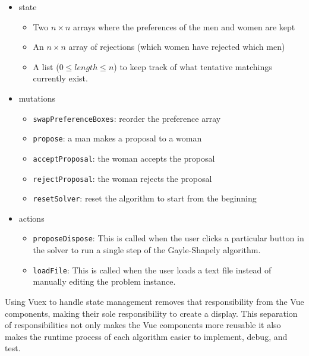 \begin{itemize}
	\item state
	\begin{itemize}
		\item Two $n \times n$ arrays where the preferences of the men and women are kept
		\item An $n \times n$ array of rejections (which women have rejected which men)
		\item A list ($0\leq length \leq n$) to keep track of what tentative matchings currently exist. 
	\end{itemize}
	\item mutations
	\begin{itemize}
		\item \texttt{swapPreferenceBoxes}: reorder the preference array
		\item \texttt{propose}: a man makes a proposal to a woman
		\item \texttt{acceptProposal}: the woman accepts the proposal
		\item \texttt{rejectProposal}: the woman rejects the proposal
		\item \texttt{resetSolver}: reset the algorithm to start from the beginning
	\end{itemize}
	\item actions
	\begin{itemize}
		\item \texttt{proposeDispose}: This is called when the user clicks a particular button in the solver
							to run a single step of the Gayle-Shapely algorithm.
		\item \texttt{loadFile}: This is called when the user loads a text file instead of manually 
							editing the problem instance. 
	\end{itemize}
\end{itemize}
Using Vuex to handle state management removes that responsibility from the Vue components,
making their sole responsibility to create a display. 
This separation of responsibilities not only makes the Vue components more reusable
it also makes the runtime process of each algorithm easier to 
implement, debug, and test.